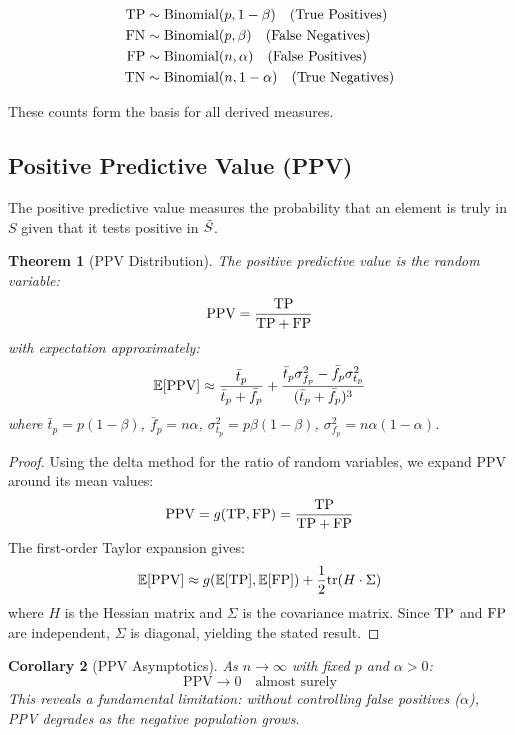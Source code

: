 \documentclass[11pt]{article}
\newcommand{\PPV}{\text{PPV}} %
\newtheorem{theorem}{Theorem}[section]
\newtheorem{corollary}[theorem]{Corollary}
\begin{document}
\begin{align}
\text{TP} &\sim \text{Binomial}(p, 1-\beta) \quad \text{(True Positives)} \\
\text{FN} &\sim \text{Binomial}(p, \beta) \quad \text{(False Negatives)} \\
\text{FP} &\sim \text{Binomial}(n, \alpha) \quad \text{(False Positives)} \\
\text{TN} &\sim \text{Binomial}(n, 1-\alpha) \quad \text{(True Negatives)}
\end{align}

These counts form the basis for all derived measures.

\subsection{Positive Predictive Value (PPV)}

The positive predictive value measures the probability that an element is truly in $S$ given that it tests positive in $\tilde{S}$.

\begin{theorem}[PPV Distribution]
The positive predictive value is the random variable:
\[
\PPV = \frac{\TP}{\TP + \FP}
\]
with expectation approximately:
\[
\Expect[\PPV] \approx \frac{\bar{t}_p}{\bar{t}_p + \bar{f}_p} + \frac{\bar{t}_p \sigma_{f_p}^2 - \bar{f}_p \sigma_{t_p}^2}{(\bar{t}_p + \bar{f}_p)^3}
\]
where $\bar{t}_p = p(1-\beta)$, $\bar{f}_p = n\alpha$, $\sigma_{t_p}^2 = p\beta(1-\beta)$, $\sigma_{f_p}^2 = n\alpha(1-\alpha)$.
\end{theorem}

\begin{proof}
Using the delta method for the ratio of random variables, we expand $\PPV$ around its mean values:
\[
\PPV = g(\TP, \FP) = \frac{\TP}{\TP + \FP}
\]
The first-order Taylor expansion gives:
\[
\Expect[\PPV] \approx g(\Expect[\TP], \Expect[\FP]) + \frac{1}{2}\text{tr}(H \cdot \Sigma)
\]
where $H$ is the Hessian matrix and $\Sigma$ is the covariance matrix. Since $\text{TP}$ and $\text{FP}$ are independent, $\Sigma$ is diagonal, yielding the stated result.
\end{proof}

\begin{corollary}[PPV Asymptotics]
As $n \rightarrow \infty$ with fixed $p$ and $\alpha > 0$:
\[
\PPV \rightarrow 0 \quad \text{almost surely}
\]
This reveals a fundamental limitation: without controlling false positives ($\alpha$), PPV degrades as the negative population grows.
\end{corollary}
\end{document}
